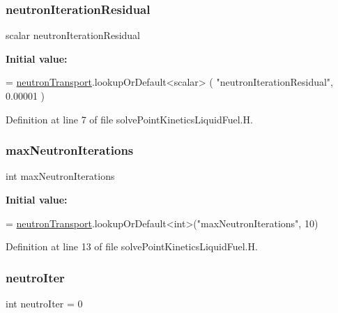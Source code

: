 \subsubsection{\texorpdfstring{neutron\+Iteration\+Residual}{neutronIterationResidual}}
{\footnotesize\ttfamily scalar neutron\+Iteration\+Residual}

{\bfseries Initial value\+:}
\begin{DoxyCode}
=
\hyperlink{solvePointKineticsLiquidFuel_8H_ac82f3800c6fe7f00c65fbf04d3c1050d}{neutronTransport}.lookupOrDefault<scalar>
(
    \textcolor{stringliteral}{"neutronIterationResidual"},
    0.00001
)
\end{DoxyCode}


Definition at line 7 of file solve\+Point\+Kinetics\+Liquid\+Fuel.\+H.

\mbox{\label{solvePointKineticsLiquidFuel_8H_aeeb27a033c3d21cdfe4cc47565bc21a2}} 
\subsubsection{\texorpdfstring{max\+Neutron\+Iterations}{maxNeutronIterations}}
{\footnotesize\ttfamily int max\+Neutron\+Iterations}

{\bfseries Initial value\+:}
\begin{DoxyCode}
=
\hyperlink{solvePointKineticsLiquidFuel_8H_ac82f3800c6fe7f00c65fbf04d3c1050d}{neutronTransport}.lookupOrDefault<\textcolor{keywordtype}{int}>(\textcolor{stringliteral}{"maxNeutronIterations"}, 10)
\end{DoxyCode}


Definition at line 13 of file solve\+Point\+Kinetics\+Liquid\+Fuel.\+H.

\mbox{\label{solvePointKineticsLiquidFuel_8H_aaccb2b7dfd16dab02e52710265a05476}} 
\subsubsection{\texorpdfstring{neutro\+Iter}{neutroIter}}
{\footnotesize\ttfamily int neutro\+Iter = 0}




